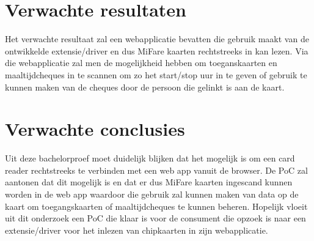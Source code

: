 \documentclass{hogent-article}
\begin{document}
\section{Verwachte resultaten}
Het verwachte resultaat zal een webapplicatie bevatten die gebruik maakt van de ontwikkelde extensie/driver en dus MiFare kaarten rechtstreeks in kan lezen. Via die webapplicatie zal men de mogelijkheid hebben om toeganskaarten en maaltijdcheques in te scannen om zo het start/stop uur in te geven of gebruik te kunnen maken van de cheques door de persoon die gelinkt is aan de kaart.

\section{Verwachte conclusies}
Uit deze bachelorproef moet duidelijk blijken dat het mogelijk is om een card reader rechtstreeks te verbinden met een web app vanuit de browser. De PoC zal aantonen dat dit mogelijk is en dat er dus MiFare kaarten ingescand kunnen worden in de web app waardoor die gebruik zal kunnen maken van data op de kaart om toegangskaarten of maaltijdcheques te kunnen beheren. Hopelijk vloeit uit dit onderzoek een PoC die klaar is voor de consument die opzoek is naar een extensie/driver voor het inlezen van chipkaarten in zijn webapplicatie.

\printbibliography[heading=bibintoc]
\end{document}
